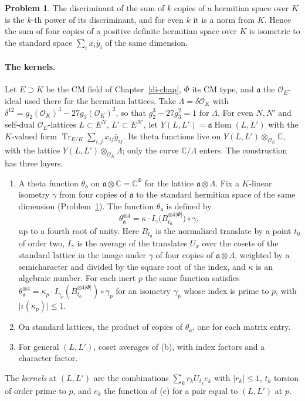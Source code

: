 \documentclass[reqno]{amsart}
\newcounter{chap}
\theoremstyle{definition}
\newtheorem{problem}{Problem}[section]
\theoremstyle{plain}
\theoremstyle{remark}
\newcommand{\C}{\mathbb C}
\newcommand{\Oc}{\mathcal O}
\begin{document}
\begin{problem}\label{pr:landherr}
The discriminant of the sum of \(k\) copies of a hermitian space over \(K\) is the \(k\)-th power of its discriminant, and for even \(k\) it is a norm from \(K\).  Hence the sum of four copies of a positive definite hermitian space over \(K\) is isometric to the standard space \(\sum_ix_i\bar y_i\) of the same dimension.
\end{problem}

\paragraph{The kernels.}  Let \(E\supset K\) be the CM field of Chapter~\ref{di-chap}, \(\Phi\) its CM type, and \(\mathfrak a\) the \(\Oc_E\)-ideal used there for the hermitian lattices.  Take \(\Lambda=\delta\Oc_K\) with \(\delta^{12}=g_2(\Oc_K)^3-27g_3(\Oc_K)^2\), so that \(g_2^3-27g_3^2=1\) for \(\Lambda\).  For even \(N,N'\) and self-dual \(\Oc_E\)-lattices \(L\subset E^N\), \(L'\subset E^{N'}\), let \(Y(L,L')=\mathfrak a\operatorname{Hom}(L,L')\) with the \(K\)-valued form \(\operatorname{Tr}_{E/K}\sum_{i,j}x_{ij}\bar y_{ij}\).  Its theta functions live on \(Y(L,L')\otimes_{\Oc_K}\C\), with the lattice \(Y(L,L')\otimes_{\Oc_K}\Lambda\); only the curve \(\C/\Lambda\) enters.  The construction has three layers.
\begin{enumerate}
\item[(a)] A theta function \(\theta_{\mathfrak a}\) on \(\mathfrak a\otimes\C=\C^\Phi\) for the lattice \(\mathfrak a\otimes\Lambda\).  Fix a \(K\)-linear isometry \(\gamma\) from four copies of \(\mathfrak a\) to the standard hermitian space of the same dimension (Problem~\ref{pr:landherr}).  The function \(\theta_{\mathfrak a}\) is defined by
\[
 \theta_{\mathfrak a}^{\otimes4}=\kappa\cdot I_\gamma\big(B_{t_0}^{\otimes4\lvert\Phi\rvert}\big)\circ\gamma ,
\]
up to a fourth root of unity.  Here \(B_{t_0}\) is the normalized translate by a point \(t_0\) of order two, \(I_\gamma\) is the average of the translates \(U_x\) over the cosets of the standard lattice in the image under \(\gamma\) of four copies of \(\mathfrak a\otimes\Lambda\), weighted by a semicharacter and divided by the square root of the index, and \(\kappa\) is an algebraic number.  For each inert \(p\) the same function satisfies \(\theta_{\mathfrak a}^{\otimes4}=\kappa_p\cdot I_{\gamma_p}(B_{t_0}^{\otimes4\lvert\Phi\rvert})\circ\gamma_p\) for an isometry \(\gamma_p\) whose index is prime to \(p\), with \(\lvert\iota(\kappa_p)\rvert\le1\).
\item[(b)] On standard lattices, the product of copies of \(\theta_{\mathfrak a}\), one for each matrix entry.
\item[(c)] For general \((L,L')\), coset averages of (b), with index factors and a character factor.
\end{enumerate}
The \emph{kernels} at \((L,L')\) are the combinations \(\sum_kr_kU_{t_k}e_k\) with \(\lvert r_k\rvert\le1\), \(t_k\) torsion of order prime to \(p\), and \(e_k\) the function of (c) for a pair equal to \((L,L')\) at \(p\).
\end{document}
